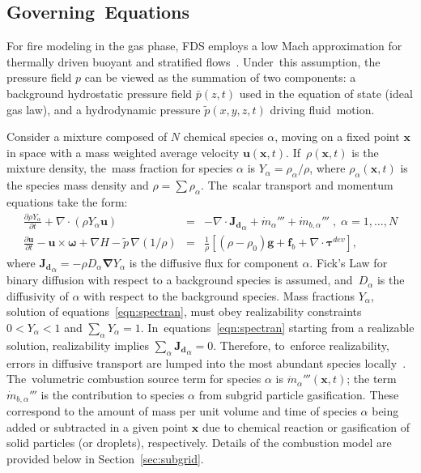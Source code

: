 \documentclass[atmosphere,article,accept,moreauthors,pdftex]{Definitions/mdpi}
\begin{document}
\subsection{Governing~Equations} \label{sec:goveqns}

For fire modeling in the gas phase, FDS employs a low Mach approximation for thermally driven buoyant and stratified flows~\cite{Rehm:1}. Under~this assumption, the pressure field $p$ can be viewed as the summation of two components: a background hydrostatic pressure field $\bar{p}(z,t)$ used in the equation of state (ideal gas law), and a hydrodynamic pressure $\tilde{p}(x,y,z,t)$ driving fluid~motion.

Consider a mixture composed of $N$ chemical species $\alpha$, moving on a fixed point $\mathbf{x}$ in space with a mass weighted average velocity $\mathbf{u}(\mathbf{x},t)$. If~$\rho(\mathbf{x},t)$ is the mixture density, the~mass fraction for species $\alpha$ is $Y_\alpha = \rho_\alpha / \rho$, where $\rho_\alpha(\mathbf{x},t)$ is the species mass density and $\rho = \sum \rho_\alpha$. The~scalar transport and momentum equations take the form:
\begin{eqnarray}
   \frac{\partial \rho Y_\alpha}{ \partial t} + \nabla \cdot ( \rho Y_\alpha  \mathbf{u} ) &=& - \nabla \cdot \mathbf{J_{d}}_\alpha + \dot{m}_\alpha'''  +
    \dot{m}_{b,\alpha}'''\; , \; \alpha=1,\dots,N \label{eqn:spectran} \\
    \frac{\partial \mathbf{u}}{\partial t} - \mathbf{u} \times \boldsymbol{\omega} + \nabla H - \tilde{p} \, \nabla \left( 1/\rho\right) &=&
    \frac{1}{\rho} \left[ (\rho-\rho_0) \mathbf{g} + \mathbf{f}_{b} + \nabla \cdot \boldsymbol{\tau}^{dev} \right] \label{eqn:momtran},
\end{eqnarray}
where $\mathbf{J_{d}}_\alpha=- \rho D_\alpha \boldsymbol{\nabla} Y_\alpha$ is the diffusive flux for component $\alpha$. Fick's Law for binary diffusion with respect to a background species is assumed, and~$D_\alpha$ is the diffusivity of $\alpha$ with respect to the background species.  Mass fractions $Y_\alpha$, solution of equations~\eqref{eqn:spectran}, must obey realizability constraints $0<Y_\alpha<1$ and $\sum_\alpha Y_\alpha=1$. In~equations~\eqref{eqn:spectran} starting from a realizable solution, realizability implies $\sum_\alpha \mathbf{J_{d}}_\alpha = 0$. Therefore, to~enforce realizability, errors in diffusive transport are lumped into the most abundant species locally~\cite{McDermott:2015}. The~volumetric combustion source term for species $\alpha$ is $\dot{m}_\alpha'''(\mathbf{x},t)$;  the term $\dot{m}_{b,\alpha}'''$ is the contribution to species $\alpha$ from subgrid particle gasification. These correspond to the amount of mass per unit volume and time of species $\alpha$ being added or subtracted in a given point $\mathbf{x}$ due to chemical reaction or gasification of solid particles (or droplets), respectively.  Details of the combustion model are provided below in Section~\ref{sec:subgrid}.
\end{document}
